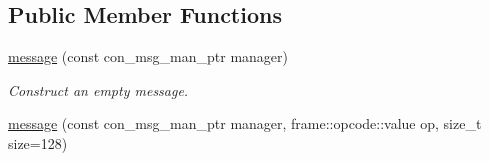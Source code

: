 \subsection*{Public Member Functions}
\begin{DoxyCompactItemize}
\item 
\hyperlink{classwebsocketpp_1_1message__buffer_1_1message_ae3cb82d2876aebcf9909d87858e0f4af}{message} (const con\+\_\+msg\+\_\+man\+\_\+ptr manager)
\begin{DoxyCompactList}\small\item\em Construct an empty message. \end{DoxyCompactList}\item 
\hyperlink{classwebsocketpp_1_1message__buffer_1_1message_a09c574d6d92b28629bed43bbbc674db1}{message} (const con\+\_\+msg\+\_\+man\+\_\+ptr manager, frame\+::opcode\+::value op, size\+\_\+t size=128)\hypertarget{classwebsocketpp_1_1message__buffer_1_1message_a09c574d6d92b28629bed43bbbc674db1}{}\label{classwebsocketpp_1_1message__buffer_1_1message_a09c574d6d92b28629bed43bbbc674db1}


\end{DoxyCompactItemize}
